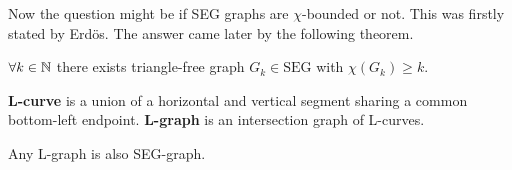 Now the question might be if SEG graphs are $\chi$-bounded or not. This was firstly stated by Erdös. The answer came later by the following theorem.

\begin{thm}
	$\forall k \in \mathbb{N}$ there exists triangle-free graph $G_k \in \text{SEG}$ with $\chi(G_k) \geq k$.
	\label{PKKLMTW thm}
\end{thm}

\begin{defn}
	\textbf{L-curve} is a union of a horizontal and vertical segment sharing a common bottom-left endpoint. \textbf{L-graph} is an intersection graph of L-curves.
\end{defn}

\begin{thm}
	Any L-graph is also SEG-graph.
\end{thm}


